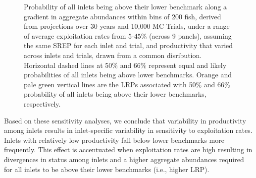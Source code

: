 \documentclass[11pt]{book}
\begin{document}
\begin{figure}[htb]

{\centering {} 

}

\caption{Probability of all inlets being above their lower benchmark along a gradient in aggregate abundances within bins of 200 fish, derived from projections over 30 years and 10,000 MC Trials, under a range of average exploitation rates from 5-45\% (across 9 panels), assuming the same SREP for each inlet and trial, and productivity that varied across inlets and trials, drawn from a common disribution. Horizontal dashed lines at 50\% and 66\% represent equal and likely probabilities of all inlets being above lower benchmarks. Orange and pale green vertical lines are the LRPs associated with 50\% and 66\% probability of all inlets being above their lower benchmarks, respectively. }\label{fig:chinook-ProjLRPs-SameSREP}
\end{figure}
\linebreak

Based on these sensitivity analyses, we conclude that variability in productivity among inlets results in inlet-specific variability in sensitivity to exploitation rates. Inlets with relatively low productivity fall below lower benchmarks more frequently. This effect is accentuated when exploitation rates are high resulting in divergences in status among inlets and a higher aggregate abundances required for all inlets to be above their lower benchmarks (i.e., higher LRP).
\end{document}
